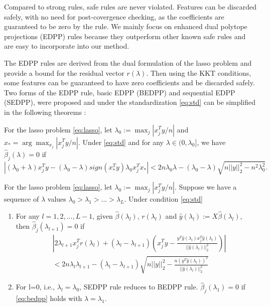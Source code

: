 Compared to strong rules, safe rules are never violated. Features can be discarded safely, with no need for post-covergence checking, as the coefficients are guaranteed to be zero by the rule. We mainly focus on enhanced dual polytope projections (EDPP) rules\citep{wang2013lasso} because they outperform other known safe rules and are easy to incorporate into our method.

The EDPP rules are derived from the dual formulation of the lasso problem and provide a bound for the residual vector $r(\lambda)$. Then using the KKT conditions, some features can be guaranteed to have zero coefficients and be discarded safely. Two forms of the EDPP rule, basic EDPP (BEDPP) and sequential EDPP (SEDPP)\citep{wang2013lasso}, were proposed and under the standardization \eqref{eq:std} can be simplified in the following theorems \citep{Zeng2021}:

\begin{theorem}[BEDPP]
    For the lasso problem \eqref{eq:lasso}, let $\lambda_0:=\max_j|x_j^Ty/n|$ and $x_*=\arg \max_{x_j}|x_j^Ty/n|$. Under \eqref{eq:std} and for any $\lambda\in(0,\lambda_0]$, we have $\hat{\beta}_j(\lambda)=0$ if
    \begin{equation}
        \label{eq:bedpp}
        |(\lambda_0+\lambda)x_j^Ty-(\lambda_0-\lambda)sign(x_*^Ty)\lambda_0x_j^Tx_*|<2n\lambda_0\lambda-(\lambda_0-\lambda)\sqrt{n||y||_2^2-n^2\lambda_0^2}.
    \end{equation}
\end{theorem}

\begin{theorem}[SEDPP]
    For the lasso problem \eqref{eq:lasso}, let $\lambda_0:=\max_j|x_j^Ty/n|$. Suppose we have a sequence of $\lambda$ values $\lambda_0>\lambda_1>...>\lambda_L$. Under condition \eqref{eq:std}
    \begin{enumerate}
        \item For any $l=1,2,...,L-1$, given $\hat{\beta}(\lambda_l)$, $r(\lambda_l)$ and $\hat{y}(\lambda_l):=X\hat{\beta}(\lambda_l)$, then $\hat{\beta}_j(\lambda_{l+1})=0$ if
        \begin{equation}
            \label{eq:sedpp}
            \begin{split}
                &\left|2\lambda_{l+1}x_j^Tr(\lambda_l)+(\lambda_l-\lambda_{l+1})\left( x_j^Ty-\frac{y^T\hat{y}(\lambda_l)x_j^T\hat{y}(\lambda_l)}{||\hat{y}(\lambda_l)||_2^2}\right)\right|\\&<2n\lambda_l\lambda_{l+1}-(\lambda_l-\lambda_{l+1})\sqrt{n||y||_2^2-\frac{n(y^T\hat{y}(\lambda_l))^2}{||\hat{y}(\lambda_l)||_2^2}}
            \end{split}
        \end{equation}
        \item For l=0, i.e., $\lambda_l=\lambda_0$, SEDPP rule reduces to BEDPP rule. $\hat{\beta}_j(\lambda_1)=0$ if \eqref{eq:bedpp} holds with $\lambda=\lambda_1$.
    \end{enumerate}
\end{theorem}

